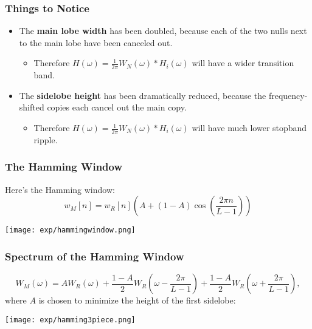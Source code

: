 \documentclass{beamer}
\begin{document}
\begin{frame}
  \frametitle{Things to Notice}

  \begin{itemize}
  \item The {\bf main lobe width} has been doubled, because each of
    the two nulls next to the main lobe have been canceled out.
    \begin{itemize}
    \item Therefore $H(\omega)=\frac{1}{2\pi}W_N(\omega)\ast
      H_i(\omega)$ will have a wider transition band.
    \end{itemize}
  \item The {\bf sidelobe height} has been dramatically reduced,
    because the frequency-shifted copies each cancel out the main
    copy.
    \begin{itemize}
    \item Therefore $H(\omega)=\frac{1}{2\pi}W_N(\omega)\ast
      H_i(\omega)$ will have much lower stopband ripple.
    \end{itemize}
  \end{itemize}
\end{frame}


\begin{frame}
  \frametitle{The Hamming Window}

  Here's the Hamming window:
  \begin{displaymath}
    w_M[n] = w_R[n]\left(A + (1-A)\cos\left(\frac{2\pi n}{L-1}\right)\right)
  \end{displaymath}
  \centerline{\texttt{[image: exp/hammingwindow.png]}}
\end{frame}

\begin{frame}
  \frametitle{Spectrum of the Hamming Window}

  \begin{displaymath}
    W_M(\omega)= AW_R(\omega)+ \frac{1-A}{2}W_R\left(\omega-\frac{2\pi}{L-1}\right)+
    \frac{1-A}{2}W_R\left(\omega+\frac{2\pi}{L-1}\right),
  \end{displaymath}
  where $A$ is chosen to minimize the height of the first sidelobe:
  \begin{center}
    \texttt{[image: exp/hamming3piece.png]}
  \end{center}
\end{frame}
\end{document}
